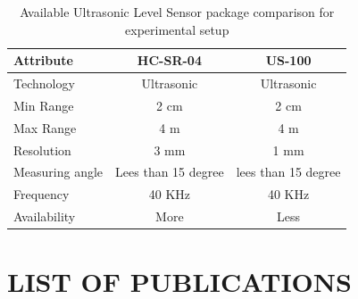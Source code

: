 \documentclass[a4paper,12pt]{report}
\begin{document}
\begin{table}[h]
\centering
\caption{Available Ultrasonic Level Sensor package comparison for experimental setup}
\begin{tabular}{||l|c|c|}\hline
\textbf{Attribute} &\textbf{HC-SR-04}	& \textbf{US-100} \\ \hline
Technology	& Ultrasonic & Ultrasonic\\ \hline
Min Range 	& 2 cm	& 2 cm \\ \hline
Max Range	& 4 m &	4 m	\\ \hline
Resolution	& 3 mm	& 1 mm \\ \hline
Measuring angle & Lees than 15 degree & lees than 15 degree \\ \hline
Frequency	& 40 KHz	& 40 KHz	\\ \hline
Availability	& More		& Less		\\ \hline
\end{tabular}
\end{table}




\medskip

\nocite{*}


\label{chap:references}

\appendix
\chapter{LIST OF PUBLICATIONS}

% 
\end{document}
